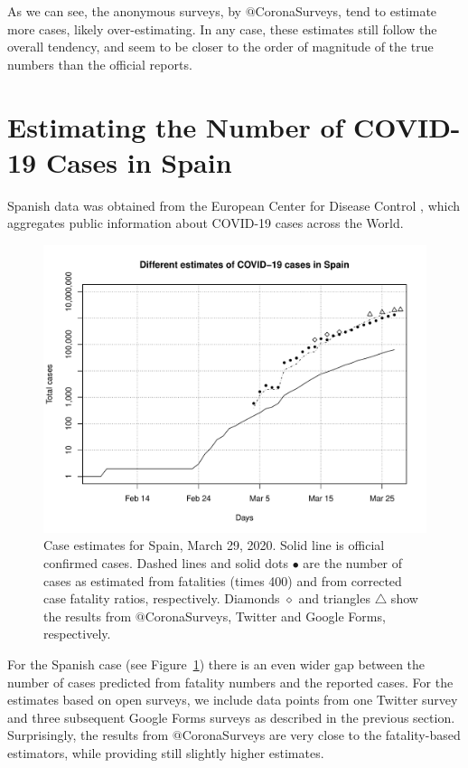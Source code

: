 \documentclass{article}
\begin{document}
As we can see, the anonymous surveys, by $@$CoronaSurveys, tend to estimate more cases, likely over-estimating. In any case, these estimates still follow the overall tendency, and seem to be closer to the order of magnitude of the true numbers than the official reports. 

\section{Estimating the Number of COVID-19 Cases in Spain}

Spanish data was obtained from the European Center for Disease Control \cite{ECDC}, which aggregates public information about COVID-19 cases across the World. 

\begin{figure}
\begin{center}
\includegraphics[width=0.9\linewidth]{EstSPMar29.pdf}
\end{center}
\caption{Case estimates for Spain, March 29, 2020. Solid line is official confirmed cases. Dashed lines and solid dots $\bullet$ are the number of cases as estimated from fatalities (times 400) and from corrected case fatality ratios, respectively. Diamonds $\diamond$ and triangles  $\triangle$ show the results from $@$CoronaSurveys, Twitter and Google Forms, respectively.}
\label{sp}
\end{figure}

For the Spanish case (see Figure~\ref{sp}) there is an even wider gap between the number of cases predicted from fatality numbers and the reported cases. For the estimates based on open surveys, we include data points from one Twitter survey and three subsequent Google Forms surveys as described in the previous section. Surprisingly, the results from $@$CoronaSurveys are very close to the fatality-based estimators, while providing still slightly higher estimates. 
\end{document}

